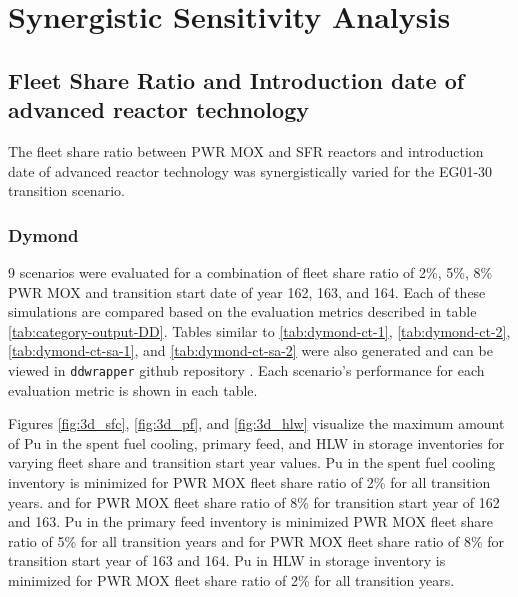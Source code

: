 \begin{table}[H]
    \end{table}

\section{Synergistic Sensitivity Analysis}
\subsection{
Fleet Share Ratio and Introduction date of advanced 
reactor technology}
The fleet share ratio between PWR MOX and SFR 
reactors and introduction date of advanced reactor 
technology was synergistically varied for 
the EG01-30 transition scenario. 

\subsubsection{\textbf{Dymond}}
9 scenarios were evaluated for a combination of fleet share ratio 
of 2\%, 5\%, 8\% PWR MOX and transition start date of year 162, 163, 
and 164.
Each of these simulations are compared based on the evaluation
metrics described in table \ref{tab:category-output-DD}.
Tables similar to \ref{tab:dymond-ct-1}, \ref{tab:dymond-ct-2}, 
\ref{tab:dymond-ct-sa-1}, and \ref{tab:dymond-ct-sa-2} were also generated
and can be viewed in \texttt{ddwrapper} github repository 
\cite{ddwrapper_doi_2019}. 
Each scenario's performance for each evaluation metric is shown in each table. 

Figures \ref{fig:3d_sfc}, \ref{fig:3d_pf}, and \ref{fig:3d_hlw}
visualize the maximum amount of Pu in the spent fuel cooling, 
primary feed, and \gls{HLW} in storage inventories for varying 
fleet share and transition start year values. 
Pu in the spent fuel cooling inventory is minimized for PWR MOX
fleet share ratio of 2\% for all transition years. 
and for PWR MOX fleet share ratio of 8\% for 
transition start year of 162 and 163.  
Pu in the primary feed inventory is minimized PWR MOX
fleet share ratio of 5\% for all transition years and for PWR MOX 
fleet share ratio of 8\% for 
transition start year of 163 and 164.                       
Pu in HLW in storage inventory is minimized for PWR MOX
fleet share ratio of 2\% for all transition years. 

